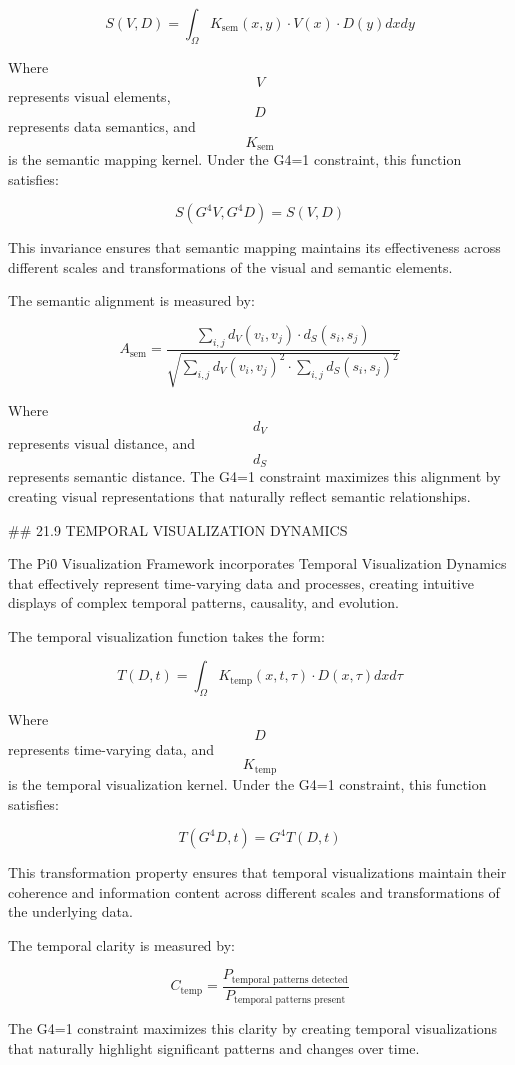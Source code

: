 $$ S(V, D) = \int_{\Omega} K_{\text{sem}}(x, y) \cdot V(x) \cdot D(y) dx dy $$

Where $$ V $$ represents visual elements, $$ D $$ represents data semantics, and $$ K_{\text{sem}} $$ is the semantic mapping kernel. Under the G4=1 constraint, this function satisfies:

$$ S(G^4 V, G^4 D) = S(V, D) $$

This invariance ensures that semantic mapping maintains its effectiveness across different scales and transformations of the visual and semantic elements.

The semantic alignment is measured by:

$$ A_{\text{sem}} = \frac{\sum_{i,j} d_V(v_i, v_j) \cdot d_S(s_i, s_j)}{\sqrt{\sum_{i,j} d_V(v_i, v_j)^2 \cdot \sum_{i,j} d_S(s_i, s_j)^2}} $$

Where $$ d_V $$ represents visual distance, and $$ d_S $$ represents semantic distance. The G4=1 constraint maximizes this alignment by creating visual representations that naturally reflect semantic relationships.

## 21.9 TEMPORAL VISUALIZATION DYNAMICS

The Pi0 Visualization Framework incorporates Temporal Visualization Dynamics that effectively represent time-varying data and processes, creating intuitive displays of complex temporal patterns, causality, and evolution.

The temporal visualization function takes the form:

$$ T(D, t) = \int_{\Omega} K_{\text{temp}}(x, t, \tau) \cdot D(x, \tau) dx d\tau $$

Where $$ D $$ represents time-varying data, and $$ K_{\text{temp}} $$ is the temporal visualization kernel. Under the G4=1 constraint, this function satisfies:

$$ T(G^4 D, t) = G^4 T(D, t) $$

This transformation property ensures that temporal visualizations maintain their coherence and information content across different scales and transformations of the underlying data.

The temporal clarity is measured by:

$$ C_{\text{temp}} = \frac{P_{\text{temporal patterns detected}}}{P_{\text{temporal patterns present}}} $$

The G4=1 constraint maximizes this clarity by creating temporal visualizations that naturally highlight significant patterns and changes over time.

